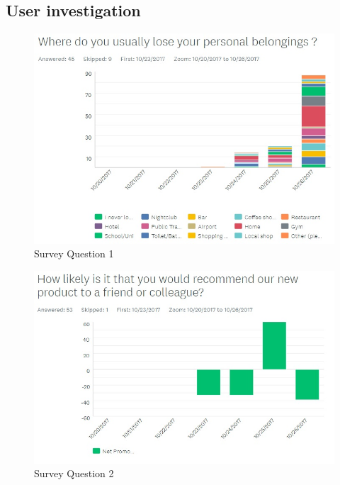 \documentclass[12pt,a4paper]{article}
\begin{document}
    
    \begin{appendices}      

      \section{User investigation}
      \label{appendix:user-investigation}
      
        \begin{figure}[H]
          \centering
          \includegraphics[width=1\textwidth]{assets/12-2-survey-1.jpg}
          \caption{Survey Question 1}
          \label{fig:Survey Question 1}
        \end{figure}
      
        \begin{figure}[H]
          \centering
          \includegraphics[width=1\textwidth]{assets/12-2-survey-2.jpg}
          \caption{Survey Question 2}
          \label{fig:Survey Question 2}
        \end{figure}


\end{appendices}
\end{document}
